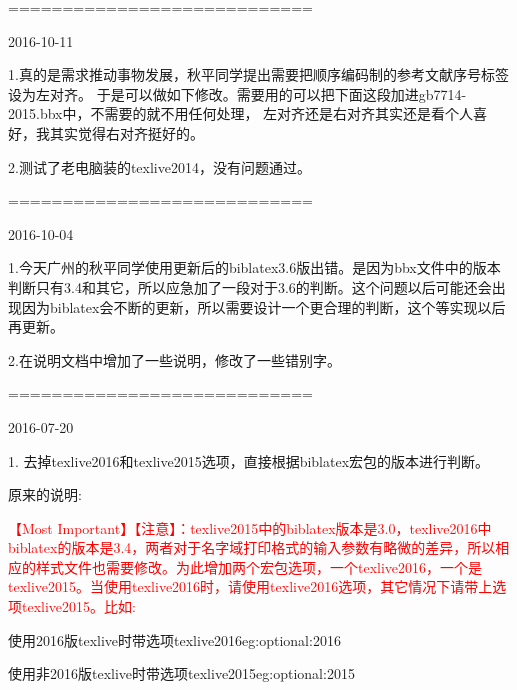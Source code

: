 \documentclass[11pt]{article} %
\begin{document}
============================

2016-10-11

1.真的是需求推动事物发展，秋平同学提出需要把顺序编码制的参考文献序号标签设为左对齐。
于是可以做如下修改。需要用的可以把下面这段加进gb7714-2015.bbx中，不需要的就不用任何处理，
左对齐还是右对齐其实还是看个人喜好，我其实觉得右对齐挺好的。
\begin{texlist}
\end{texlist}

2.测试了老电脑装的texlive2014，没有问题通过。


============================

2016-10-04

1.今天广州的秋平同学使用更新后的biblatex3.6版出错。是因为bbx文件中的版本判断只有3.4和其它，所以应急加了一段对于3.6的判断。这个问题以后可能还会出现因为biblatex会不断的更新，所以需要设计一个更合理的判断，这个等实现以后再更新。

2.在说明文档中增加了一些说明，修改了一些错别字。

============================

2016-07-20

1. 去掉texlive2016和texlive2015选项，直接根据biblatex宏包的版本进行判断。

原来的说明:
\begin{texlist}
    \textcolor{red}{\HandRight \heiti 【Most Important】【注意】：texlive2015中的biblatex版本是3.0，texlive2016中biblatex的版本是3.4，两者对于名字域打印格式的输入参数有略微的差异，所以相应的样式文件也需要修改。为此增加两个宏包选项，一个texlive2016，一个是texlive2015。当使用texlive2016时，请使用texlive2016选项，其它情况下请带上选项texlive2015。比如:}

    \begin{codetex}{使用2016版texlive时带选项texlive2016}{eg:optional:2016}
    \usepackage[backend=biber,texlive2016,style=gb7714-2015]{biblatex}
    \end{codetex}

    \begin{codetex}{使用非2016版texlive时带选项texlive2015}{eg:optional:2015}
    \usepackage[backend=biber,texlive2015,style=gb7714-2015]{biblatex}
    \end{codetex}
\end{texlist}
\end{document}
